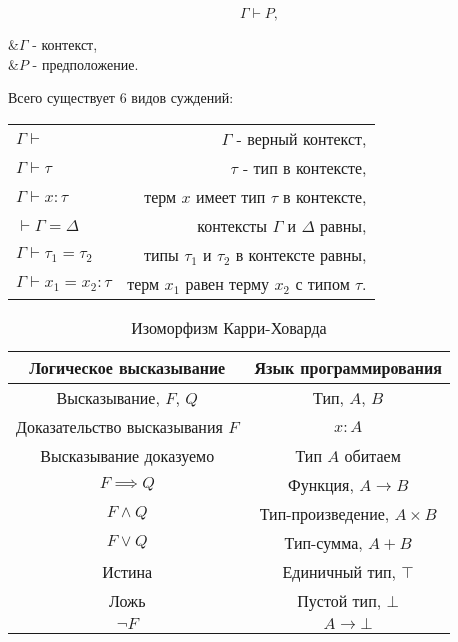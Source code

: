\begin{equation}
    \Gamma \vdash P,
    \label{eq:judgment}
\end{equation}
\begin{eqrem}
    &$\Gamma$ - контекст,\\
    &$P$ - предположение.\\
\end{eqrem}

Всего существует 6 видов суждений:

\begin{table}[h]
    \centering
    \label{tab:types_of_judgments}
    \begin{tabular}{l r}
        $\Gamma \vdash$                  & $\Gamma$ - верный контекст,                  \\
        $\Gamma \vdash \tau$             & $\tau$ - тип в контексте,                    \\
        $\Gamma \vdash x: \tau$          & терм $x$ имеет тип $\tau$ в контексте,       \\
        $\vdash \Gamma = \Delta$         & контексты $\Gamma$ и $\Delta$ равны,         \\
        $\Gamma \vdash \tau_1 = \tau_2$  & типы $\tau_1$ и $\tau_2$ в контексте равны,  \\
        $\Gamma \vdash x_1 = x_2 : \tau$ & терм $x_1$ равен терму $x_2$ с типом $\tau$.
    \end{tabular}
\end{table}

\begin{table}[h]
    \centering
    \caption{Изоморфизм Карри-Ховарда}
    \label{tab:curry-hovard-iso}
    \begin{tabular}{|c|c|}
        \hline
        \textbf{Логическое высказывание} & \textbf{Язык программирования} \\\hline
        Высказывание, $F$, $Q$           & Тип, $A$, $B$                  \\\hline
        Доказательство высказывания $F$  & $x: A$                         \\\hline
        Высказывание доказуемо           & Тип $A$ обитаем                \\\hline
        $F \implies Q$                   & Функция, $A \to B$             \\\hline
        $F \wedge Q$                     & Тип-произведение, $A \times B$ \\\hline
        $F \vee Q$                       & Тип-сумма, $A + B$             \\\hline
        Истина                           & Единичный тип, $\top$          \\\hline
        Ложь                             & Пустой тип, $\bot$             \\\hline
        $\neg F$                         & $A \to \bot$                   \\\hline
    \end{tabular}
\end{table}

